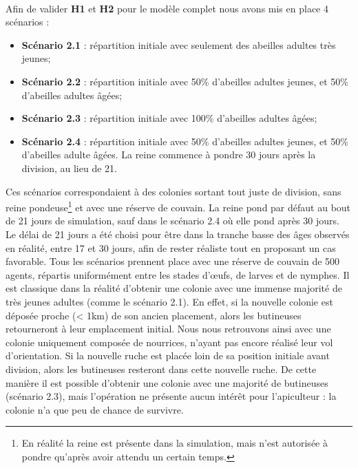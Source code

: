 			\paragraph{}
			
			Afin de valider \textbf{H1} et \textbf{H2} pour le modèle complet nous avons mis en place 4 scénarios :			
			\begin{itemize}
					\item \textbf{Scénario 2.1} : répartition initiale avec seulement des abeilles adultes très jeunes;
					\item \textbf{Scénario 2.2} : répartition initiale avec 50\% d'abeilles adultes jeunes, et 50\% d'abeilles adultes âgées;
					\item \textbf{Scénario 2.3} : répartition initiale avec 100\% d'abeilles adultes âgées;
					\item \textbf{Scénario 2.4} : répartition initiale avec 50\% d'abeilles adultes jeunes, et 50\% d'abeilles adulte âgées. La reine commence à pondre 30 jours après la division, au lieu de 21.
			\end{itemize}
			
			Ces scénarios correspondaient à des colonies sortant tout juste de division, sans reine pondeuse\footnote{En réalité la reine est présente dans la simulation, mais n'est autorisée à pondre qu'après avoir attendu un certain temps.} et avec une réserve de couvain. La reine pond par défaut au bout de 21 jours de simulation, sauf dans le scénario 2.4 où elle pond après 30 jours. Le délai de 21 jours a été choisi pour être dans la tranche basse des âges observés en réalité, entre 17 et 30 jours, afin de rester réaliste tout en proposant un cas favorable. Tous les scénarios prennent place avec une réserve de couvain de 500 agents, répartis uniformément entre les stades d'œufs, de larves et de nymphes. Il est classique dans la réalité d'obtenir une colonie avec une immense majorité de très jeunes adultes (comme le scénario 2.1). En effet, si la nouvelle colonie est déposée proche (< 1km) de son ancien placement, alors les butineuses retourneront à leur emplacement initial. Nous nous retrouvons ainsi avec une colonie uniquement composée de nourrices, n'ayant pas encore réalisé leur vol d'orientation. Si la nouvelle ruche est placée loin de sa position initiale avant division, alors les butineuses resteront dans cette nouvelle ruche. De cette manière il est possible d'obtenir une colonie avec une majorité de butineuses (scénario 2.3), mais l'opération ne présente aucun intérêt pour l'apiculteur : la colonie n'a que peu de chance de survivre.
			
